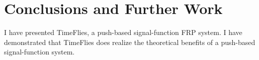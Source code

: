 \chapter{Conclusions and Further Work}
\label{chapter:Conclusions_and_Further_Work}
I have presented TimeFlies, a push-based signal-function FRP system. I have
demonstrated that TimeFlies does realize the theoretical benefits of a
push-based signal-function system.